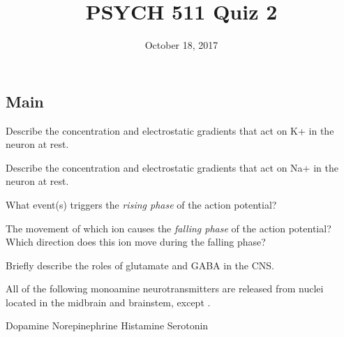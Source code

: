 \documentclass[]{exam}
\title{PSYCH 511 Quiz 2}
\author{}
\date{October 18, 2017}
\begin{document}
\maketitle

\begin{center}
\end{center}
\vspace{0.1in}

\newpage

\begin{questions}

\section{Main}

\question Describe the concentration and electrostatic gradients that act on K+ in the neuron at rest.

\vspace{0.75in}

\question Describe the concentration and electrostatic gradients that act on Na+ in the neuron at rest.

\vspace{0.75in}

\question What event(s) triggers the \emph{rising phase} of the action potential?

\vspace{0.75in}

\question The movement of which ion causes the \emph{falling phase} of the action potential?  Which direction does this ion move during the falling phase?

\vspace{0.75in}

\question Briefly describe the roles of glutamate and GABA in the CNS.

\vspace{1.0in}

\question All of the following monoamine neurotransmitters are released from nuclei located in the midbrain and brainstem, except \fillin.
\begin{choices}
\choice Dopamine
\choice Norepinephrine
\choice Histamine
\choice Serotonin
\end{choices}


\end{questions}
\end{document}
